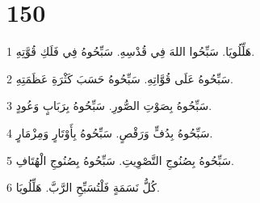 \chapter{150}

\par 1 هَلِّلُويَا. سَبِّحُوا اللهَ فِي قُدْسِهِ. سَبِّحُوهُ فِي فَلَكِ قُوَّتِهِ.
\par 2 سَبِّحُوهُ عَلَى قُوَّاتِهِ. سَبِّحُوهُ حَسَبَ كَثْرَةِ عَظَمَتِهِ.
\par 3 سَبِّحُوهُ بِصَوْتِ الصُّورِ. سَبِّحُوهُ بِرَبَابٍ وَعُودٍ.
\par 4 سَبِّحُوهُ بِدُفٍّ وَرَقْصٍ. سَبِّحُوهُ بِأَوْتَارٍ وَمِزْمَارٍ.
\par 5 سَبِّحُوهُ بِصُنُوجِ التَّصْوِيتِ. سَبِّحُوهُ بِصُنُوجِ الْهُتَافِ.
\par 6 كُلُّ نَسَمَةٍ فَلْتُسَبِّحِ الرَّبَّ. هَلِّلُويَا.

